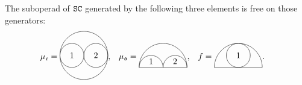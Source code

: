 \begin{lemma}
  The suboperad of $\mathtt{SC}$ generated by the following three elements is free on those generators:
  \begin{align*}
  \mu_{\col{c}}
  & =
    \begin{gathered} \begin{tikzpicture}[scale = 0.5]
      \draw (0,0) circle (2);
      \draw (-1,0) circle (1); \node at (-1,0) {$1$};
      \draw (1,0) circle (1); \node at (1,0) {$2$};
    \end{tikzpicture} \end{gathered},
  & \mu_{\col{o}}
  & =
    \begin{gathered} \begin{tikzpicture}[scale = 0.5]
        \draw (2,0) arc (0:180:2);
        \draw (0,0) arc (0:180:1); \node at (-1,0.5) {$1$};
        \draw (2,0) arc (0:180:1); \node at (1,0.5) {$2$};
        \draw (-2,0) -- (2,0);
      \end{tikzpicture} \end{gathered},
  & f
  & =
    \begin{gathered} \begin{tikzpicture}[scale = 0.5]
        \draw (2,0) arc (0:180:2);
        \draw (0,1) circle (1);
        \node at (0,1) {$1$};
        \draw (-2,0) -- (2,0);
      \end{tikzpicture} \end{gathered}.
  \end{align*}
\end{lemma}
